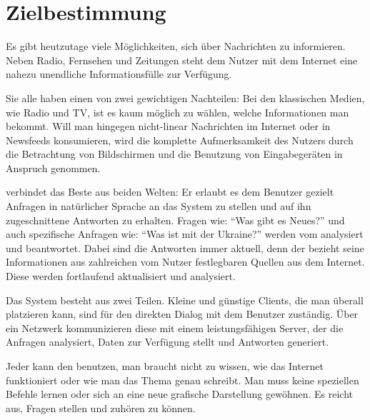 
\chapter{Zielbestimmung}\label{chap:zielbestimmung}



Es gibt heutzutage viele Möglichkeiten, sich über Nachrichten zu informieren.
Neben Radio, Fernsehen und Zeitungen steht dem Nutzer mit dem Internet eine
nahezu unendliche Informationsfülle zur Verfügung.

Sie alle haben einen von zwei gewichtigen Nachteilen: Bei den klassischen
Medien, wie Radio und TV, ist es kaum möglich zu wählen, welche Informationen
man bekommt. Will man hingegen nicht-linear Nachrichten im Internet oder in
Newsfeeds konsumieren, wird die komplette Aufmerksamkeit des Nutzers durch die
Betrachtung von Bildschirmen und die Benutzung von Eingabegeräten in Anspruch
genommen.

\NewsGenie verbindet das Beste aus beiden Welten: Er erlaubt es dem Benutzer
gezielt Anfragen in natürlicher Sprache an das System zu stellen und
auf ihn zugeschnittene Antworten zu erhalten. Fragen wie: "`Was gibt es Neues?"'
und auch spezifische Anfragen wie: "`Was ist mit der Ukraine?"' werden vom
\NewsGenie analysiert und beantwortet. Dabei sind die Antworten immer aktuell,
denn der \NewsGenie bezieht seine Informationen aus zahlreichen vom Nutzer
festlegbaren Quellen aus dem Internet. Diese werden fortlaufend aktualisiert und
analysiert.

Das System besteht aus zwei Teilen. Kleine und günstige Clients, die man
überall platzieren kann, sind für den direkten Dialog mit dem Benutzer
zuständig. Über ein Netzwerk kommunizieren diese mit einem leistungsfähigen
Server, der die Anfragen analysiert, Daten zur Verfügung stellt und Antworten
generiert.

Jeder kann den \NewsGenie benutzen, man braucht nicht zu wissen, wie das Internet 
funktioniert oder wie man das Thema genau schreibt. Man muss keine speziellen 
Befehle lernen oder sich an eine neue grafische Darstellung gewöhnen. 
Es reicht aus, Fragen stellen und zuhören zu können.

